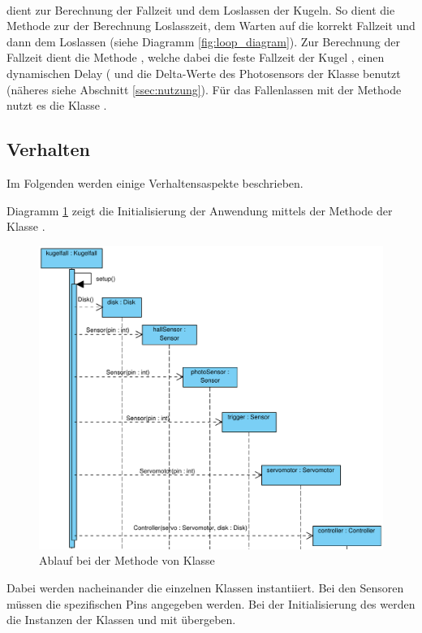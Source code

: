 \paragraph{} dient zur Berechnung der Fallzeit und dem Loslassen der Kugeln.
So dient die Methode  zur der Berechnung Loslasszeit, dem Warten auf die korrekt Fallzeit und dann dem Loslassen (siehe Diagramm \ref{fig:loop_diagram}).
Zur Berechnung der Fallzeit dient die Methode , welche dabei die feste Fallzeit der Kugel , einen dynamischen Delay ( und die Delta-Werte des Photosensors der Klasse  benutzt (näheres siehe Abschnitt \ref{ssec:nutzung}).
Für das Fallenlassen mit der Methode  nutzt es die Klasse .

\subsection{Verhalten}
Im Folgenden werden einige Verhaltensaspekte beschrieben.

Diagramm \ref{fig:setup_diagram} zeigt die Initialisierung der Anwendung mittels der Methode  der Klasse .
\begin{figure}[htbp]
	\centering
	\includegraphics[width=\linewidth]{abb/setup_cropped}
	\caption{Ablauf bei der Methode  von Klasse }
	\label{fig:setup_diagram}
\end{figure}
Dabei werden nacheinander die einzelnen Klassen instantiiert. 
Bei den Sensoren müssen die spezifischen Pins angegeben werden.
Bei der Initialisierung des  werden die Instanzen der Klassen  und  mit übergeben.


